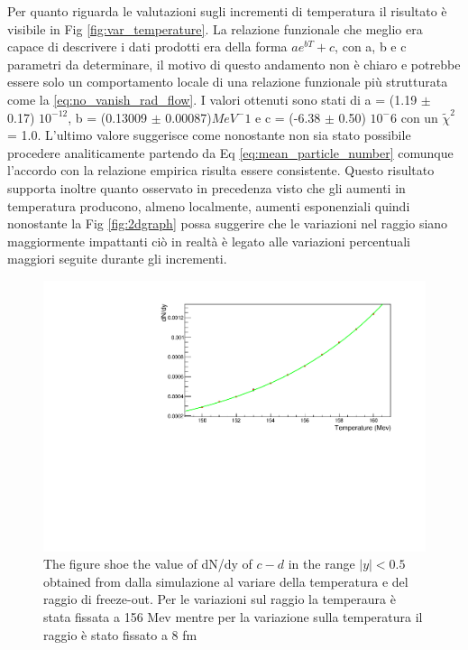 \documentclass[12pt,a4paper]{book}
\begin{document}
	Per quanto riguarda le valutazioni sugli incrementi di temperatura il risultato è visibile in Fig \ref{fig:var_temperature}. La relazione funzionale che meglio era capace di descrivere i dati prodotti era della forma $a e^{bT}+c$, con a, b e c parametri da determinare, il motivo di questo andamento non è chiaro e potrebbe essere solo un comportamento locale di una relazione funzionale più strutturata come la \ref{eq:no_vanish_rad_flow}. I valori ottenuti sono stati di a = (1.19 $\pm$ 0.17) $10^{-12}$, b = (0.13009 $\pm$ 0.00087)$MeV^-1$ e c = (-6.38 $\pm$ 0.50) $10^-6$ con un $\tilde{\chi}^2$ = 1.0. L'ultimo valore suggerisce come nonostante non sia stato possibile procedere analiticamente partendo da Eq \ref{eq:mean_particle_number} comunque l'accordo con la relazione empirica risulta essere consistente. Questo risultato supporta inoltre quanto osservato in precedenza visto che gli aumenti in temperatura producono, almeno localmente, aumenti esponenziali quindi nonostante la Fig \ref{fig:2dgraph} possa suggerire che le variazioni nel raggio siano maggiormente impattanti ciò in realtà è legato alle variazioni percentuali maggiori seguite durante gli incrementi.  
		\begin{figure}
			\centering
		\includegraphics[width=0.8 \linewidth]{pictures/var_temperaure.pdf}
		\caption{The figure shoe the value of dN/dy of $c-d$ in the range $|y|<0.5$ obtained from dalla simulazione al variare della temperatura e del raggio di freeze-out. Per le variazioni sul raggio la temperaura è stata fissata a 156 Mev mentre per la variazione sulla temperatura il raggio è stato fissato a 8 fm}
		\label{fig:var_temperaure}
	\end{figure}
	
\end{document}
